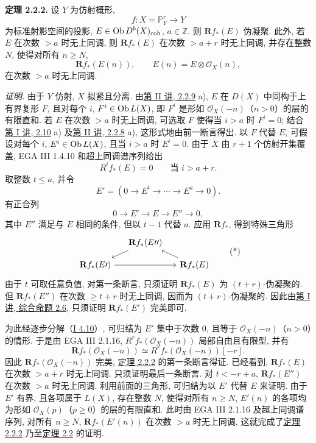 \textbf{定理 2.2.2.} 设 \(Y\) 为仿射概形,
\[
  f:X=\mathbb P^r_Y\longrightarrow Y
\]
为标准射影空间的投影, \(E\in \operatorname{Ob} D^b(X)_{\mathrm{coh}}\), \(a\in\mathbb Z\). 则 \(\mathbf Rf_*(E)\) 伪凝聚. 此外, 若 \(E\) 在次数 \(>a\) 时无上同调, 则 \(\mathbf Rf_*(E)\) 在次数 \(>a+r\) 时无上同调, 并存在整数 \(N\), 使得对所有 \(n\geq N\),
\[
  \mathbf Rf_*(E(n)),\qquad E(n)=E\otimes\mathcal O_X(n),
\]
在次数 \(>a\) 时无上同调.

\emph{证明.} 由于 \(Y\) 仿射, \(X\) 拟紧且分离. 由\hyperlink{sga6.e02.prop.2-2-9}{第 II 讲, 2.2.9} a), \(E\) 在 \(D(X)\) 中同构于上有界复形 \(F\), 且对每个 \(i\), \(F^i\in \operatorname{Ob} L(X)\), 即 \(F^i\) 是形如 \(\mathcal O_X(-n)\)（\(n>0\)）的层的有限直和. 若 \(E\) 在次数 \(>a\) 时无上同调, 可选取 \(F\) 使得当 \(i>a\) 时 \(F^i=0\); 结合\hyperlink{sga6.e01.prop.2-10}{第 I 讲, 2.10} a) 及\hyperlink{sga6.e02.thm.2-2-8}{第 II 讲, 2.2.8} a), 这形式地由前一断言得出. 以 \(F\) 代替 \(E\), 可假设对每个 \(i\), \(E^i\in \operatorname{Ob} L(X)\), 且当 \(i>a\) 时 \(E^i=0\). 由于 \(X\) 由 \(r+1\) 个仿射开集覆盖, EGA III 1.4.10 和超上同调谱序列给出
\[
  R^if_*(E)=0\qquad\text{当 }i>a+r.
\]
取整数 \(t\leq a\), 并令
\[
  E'=(0\to E^t\to\cdots\to E^a\to 0).
\]
有正合列
\[
  0\longrightarrow E'\longrightarrow E\longrightarrow E''\longrightarrow 0,
\]
其中 \(E''\) 满足与 \(E\) 相同的条件, 但以 \(t-1\) 代替 \(a\). 应用 \(\mathbf Rf_*\), 得到特殊三角形
\[
\begin{tikzcd}[column sep=small,row sep=small]
&\mathbf Rf_*(E\prime\prime)\arrow[dl]&\\
\mathbf Rf_*(E\prime)\arrow[rr]&&\mathbf Rf_*(E)\arrow[ul]
\end{tikzcd}\tag{*}
\]
由于 \(t\) 可取任意负值, 对第一条断言, 只须证明 \(\mathbf Rf_*(E)\) 为 \((t+r)\)-伪凝聚的. 但 \(\mathbf Rf_*(E'')\) 在次数 \(\geq t+r\) 时无上同调, 因而为 \((t+r)\)-伪凝聚的. 因此由\hyperlink{sga6.e01.schol.2-6}{第 I 讲, 综合命题 2.6}, 只须证明 \(\mathbf Rf_*(E')\) 完美即可.

为此经逐步分解（\hyperlink{sga6.e01.prop.4-10}{I 4.10}）, 可归结为 \(E'\) 集中于次数 \(0\), 且等于 \(\mathcal O_X(-n)\)（\(n>0\)）的情形. 于是由 EGA III 2.1.16, \(R^rf_*(\mathcal O_X(-n))\) 局部自由且有限型, 并有
\[
  \mathbf Rf_*(\mathcal O_X(-n))\simeq R^rf_*(\mathcal O_X(-n))[-r].
\]
因此 \(\mathbf Rf_*(\mathcal O_X(-n))\) 完美, \hyperlink{sga6.e03.thm.2-2-2}{定理 2.2.2} 的第一条断言得证. 已经看到, \(\mathbf Rf_*(E)\) 在次数 \(>a+r\) 时无上同调. 只须证明最后一条断言. 对 \(t<-r+a\), \(\mathbf Rf_*(E'')\) 在次数 \(>a\) 时无上同调. 利用前面的三角形, 可归结为以 \(E'\) 代替 \(E\) 来证明. 由于 \(E'\) 有界, 且各项属于 \(L(X)\), 存在整数 \(N\), 使得对所有 \(n\geq N\), \(E'(n)\) 的各项均为形如 \(\mathcal O_X(p)\)（\(p\geq0\)）的层的有限直和. 此时由 EGA III 2.1.16 及超上同调谱序列, 对所有 \(n\geq N\), \(\mathbf Rf_*(E'(n))\) 在次数 \(>a\) 时无上同调, 这就完成了\hyperlink{sga6.e03.thm.2-2-2}{定理 2.2.2} 乃至\hyperlink{sga6.e03.thm.2-2}{定理 2.2} 的证明.

